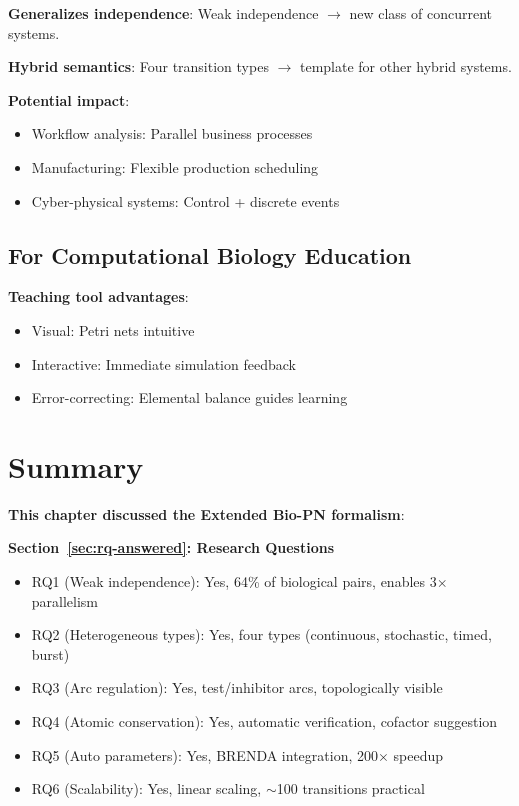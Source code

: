 \textbf{Generalizes independence}: Weak independence $\to$ new class of concurrent systems.

\textbf{Hybrid semantics}: Four transition types $\to$ template for other hybrid systems.

\textbf{Potential impact}:
\begin{itemize}
    \item Workflow analysis: Parallel business processes
    \item Manufacturing: Flexible production scheduling
    \item Cyber-physical systems: Control + discrete events
\end{itemize}

\subsection{For Computational Biology Education}
\label{subsec:for-education}

\textbf{Teaching tool advantages}:
\begin{itemize}
    \item Visual: Petri nets intuitive
    \item Interactive: Immediate simulation feedback
    \item Error-correcting: Elemental balance guides learning
\end{itemize}

\section{Summary}
\label{sec:discussion-summary}

\textbf{This chapter discussed the Extended Bio-PN formalism}:

\textbf{Section~\ref{sec:rq-answered}: Research Questions}
\begin{itemize}
    \item RQ1 (Weak independence): Yes, 64\% of biological pairs, enables 3$\times$ parallelism
    \item RQ2 (Heterogeneous types): Yes, four types (continuous, stochastic, timed, burst)
    \item RQ3 (Arc regulation): Yes, test/inhibitor arcs, topologically visible
    \item RQ4 (Atomic conservation): Yes, automatic verification, cofactor suggestion
    \item RQ5 (Auto parameters): Yes, BRENDA integration, 200$\times$ speedup
    \item RQ6 (Scalability): Yes, linear scaling, $\sim$100 transitions practical
\end{itemize}

